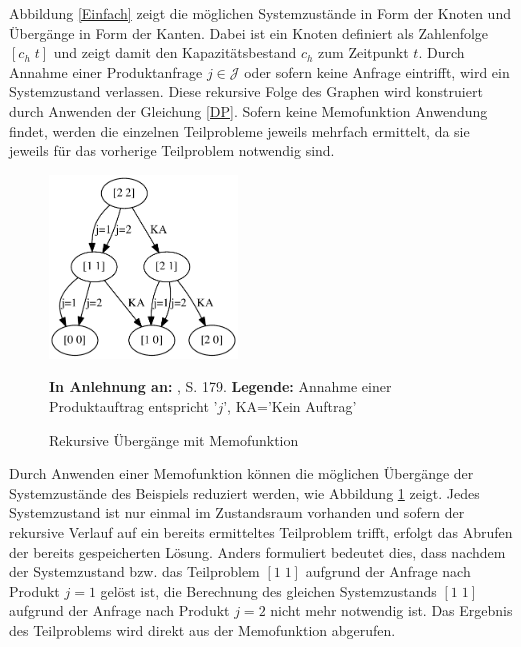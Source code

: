 Abbildung \ref{Einfach} zeigt die möglichen Systemzustände in Form der Knoten und Übergänge in Form der Kanten. Dabei ist ein Knoten definiert als Zahlenfolge $[c_h\; t]$ und zeigt damit den Kapazitätsbestand $c_h$ zum Zeitpunkt $t$. Durch Annahme einer Produktanfrage $j\in\mathcal{J}$ oder sofern keine Anfrage eintrifft, wird ein Systemzustand verlassen. Diese rekursive Folge des Graphen wird konstruiert durch Anwenden der Gleichung \eqref{DP}. Sofern keine Memofunktion Anwendung findet, werden die einzelnen Teilprobleme jeweils mehrfach ermittelt, da sie jeweils für das vorherige Teilproblem notwendig sind.

\begin{figure}[h!]
  \begin{center}
    \includegraphics[width=50mm]{Bilder/Einfach2.pdf}
    \caption{Rekursive Übergänge mit Memofunktion}  \label{Einfach2}
        {\footnotesize \textbf{In Anlehnung an:} \cite{hetland2010python}, S. 179.} 
    {\footnotesize \textbf{Legende:} Annahme einer Produktauftrag entspricht '$j$', KA='Kein Auftrag'} 
  \end{center}
\end{figure}

Durch Anwenden einer Memofunktion können die möglichen Übergänge der Systemzustände des Beispiels reduziert werden, wie Abbildung \ref{Einfach2} zeigt. Jedes Systemzustand ist nur einmal im Zustandsraum vorhanden und sofern der rekursive Verlauf auf ein bereits ermitteltes Teilproblem trifft, erfolgt das Abrufen der bereits gespeicherten Lösung. Anders formuliert bedeutet dies, dass nachdem der Systemzustand bzw. das Teilproblem $[1\; 1]$ aufgrund der Anfrage nach Produkt $j=1$ gelöst ist, die Berechnung des gleichen Systemzustands $[1\; 1]$ aufgrund der Anfrage nach Produkt $j=2$ nicht mehr notwendig ist. Das Ergebnis des Teilproblems wird direkt aus der Memofunktion abgerufen.

